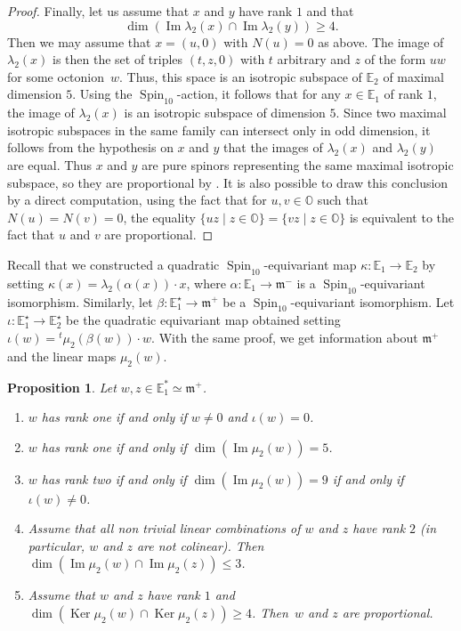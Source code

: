 \documentclass[10pt]{amsart}
\newenvironment{enumeratea}
{\bgroup\def\theenumi{\alph{enumi}}\begin{enumerate}}
{\end{enumerate}\egroup}
\newcommand{\citestar}[3]{\cite[#3]{#1}}
\theoremstyle{plain}
\newtheorem{prop}[theo]{Proposition}
\theoremstyle{definition}
\DeclareMathOperator{\im}{Im}\let\Im\im
\DeclareMathOperator{\Ker}{Ker}
\DeclareMathOperator{\Spin}{Spin}
\newcommand{\bE}{\mathbb{E}}
\newcommand{\bO}{\mathbb{O}}
\newcommand{\fm}{\mathfrak{m}}
\renewcommand{\iff}{if and only if }
\begin{document}
\begin{proof}
Finally, let us assume that $x$ and $y$ have rank $1$ and that $$\dim (\im \lambda_2(x) \cap \im \lambda_2(y)) \geq 4.$$
Then we may assume that $x=(u,0)$ with $N(u)=0$ as
above. The image of $\lambda_2(x)$ is then the set of triples $(t,z,0)$ with $t$ arbitrary and $z$ of the
form $uw$ for some octonion~$w$. Thus, this space is an isotropic subspace of $\bE_2$ of maximal dimension $5$.
Using the $\Spin_{10}$-action, it follows that for any $x \in \bE_1$ of rank $1$, the image of $\lambda_2(x)$
is an isotropic subspace of dimension $5$. Since two maximal isotropic subspaces
in the same family can intersect only
in odd dimension, it follows from the hypothesis on $x$ and $y$
that the images of $\lambda_2(x)$ and $\lambda_2(y)$ are equal. Thus
$x$ and $y$ are pure spinors representing the same maximal isotropic subspace, so they are
proportional by \citestar{chevalley}*{III.1.4}. It is also possible to draw this conclusion
by a direct computation, using the fact
that for $u,v \in \bO$ such that $N(u)=N(v)=0$, the equality
\hbox{$\{uz\mid z \in \bO\} = \{vz\mid z \in \bO\}$} is equivalent to the fact that $u$ and $v$ are proportional.	
\end{proof}

Recall that we constructed a quadratic $\Spin_{10}$-equivariant map $\kappa: \bE_1 \to \bE_2$ by setting
$\kappa(x)=\lambda_2(\alpha(x)) \cdot x$, where $\alpha: \bE_1 \to \fm^-$ is a $\Spin_{10}$-equivariant isomorphism.
Similarly, let $\beta:\bE_1^\star \to \fm^+$ be a $\Spin_{10}$-equivariant isomorphism.
Let $\iota: \bE^\star_1 \to \bE_2^\star$ be the quadratic equivariant map obtained setting
$\iota(w)={}^t \mu_2(\beta(w)) \cdot w$.
With the same proof, we get information about $\fm^+$ and the linear maps $\mu_2(w)$.

\begin{prop} \label{prop:fuplus}
Let $w,z \in \bE_1^* \simeq \fm^+$.
\begin{enumeratea}
\item $w$ has rank one \iff $w \neq 0$ and $\iota(w) = 0$.
\item $w$ has rank one \iff $\dim (\im \mu_2(w))=5$.
\item $w$ has rank two \iff $\dim (\im \mu_2(w))=9$ \iff $\iota(w) \neq 0$.
\item Assume that all non trivial linear combinations of $w$ and $z$ have rank $2$ (in particular,
$w$ and $z$ are not colinear). Then
$\dim (\im \mu_2(w) \cap \im \mu_2(z)) \leq 3$.
\item Assume that $w$ and $z$ have rank $1$ and $\dim (\Ker \mu_2(w) \cap \Ker \mu_2(z)) \geq 4$.
Then~$w$ and $z$ are proportional.
\end{enumeratea}
\end{prop}
\end{document}

